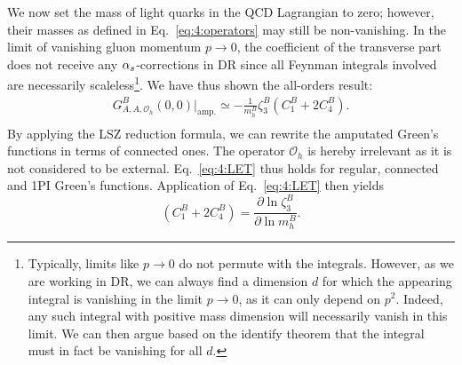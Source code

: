 We now set the mass of light quarks in the \acs{QCD} Lagrangian to zero; however, their masses as defined in Eq.~\eqref{eq:4:operators} may still be non-vanishing. In the limit of vanishing gluon momentum $p \rightarrow 0$, the coefficient of the transverse part does not receive any $\alpha_s$-corrections in \acs{DR} since all Feynman integrals involved are necessarily scaleless\footnote{Typically, limits like $p \rightarrow 0$ do not permute with the integrals. However, as we are working in \acs{DR}, we can always find a dimension $d$ for which the appearing integral is vanishing in the limit $p \rightarrow 0$, as it can only depend on $p^2$. Indeed, any such integral with positive mass dimension will necessarily vanish in this limit. We can then argue based on the identify theorem that the integral must in fact be vanishing for all $d$.}. We have thus shown the all-orders result:
\begin{equation}
\begin{gathered}
G_{A,A,\mathcal{O}_h}^B(0, 0)  \Big \vert_{\text{amp.}} \simeq -  \frac{1}{m_h^B} \zeta_3^B \left(C_1^B + 2 C_4^B \right). \\
\end{gathered}
\end{equation}
By applying the LSZ reduction formula, we can rewrite the amputated Green's functions in terms of connected ones. The operator $\mathcal{O}_h$ is hereby irrelevant as it is not considered to be external. Eq.~\eqref{eq:4:LET} thus holds for regular, connected and \acs{1PI} Green's functions. Application of Eq.~\eqref{eq:4:LET} then yields
\begin{equation}
\left(C_1^B + 2 C_4^B \right) = \frac{\partial \ln \zeta_3^B}{\partial \ln m_h^B}.
\label{eq:4:gluon_decoupling_relation}
\end{equation}

